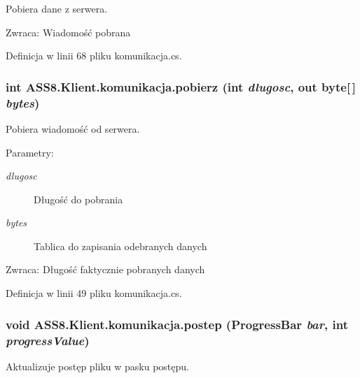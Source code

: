 Pobiera dane z serwera. 

\begin{Desc}
\item[Zwraca:]Wiadomość pobrana\end{Desc}


Definicja w linii 68 pliku komunikacja.cs.\hypertarget{a00013_19e1f9dd822287532839c60661237142}{
\subsubsection[{pobierz}]{\setlength{\rightskip}{0pt plus 5cm}int ASS8.Klient.komunikacja.pobierz (int {\em dlugosc}, \/  out byte\mbox{[}$\,$\mbox{]} {\em bytes})}}
\label{d7/dd4/a00013_19e1f9dd822287532839c60661237142}


Pobiera wiadomość od serwera. 

\begin{Desc}
\item[Parametry:]
\begin{description}
\item[{\em dlugosc}]Długość do pobrania\item[{\em bytes}]Tablica do zapisania odebranych danych\end{description}
\end{Desc}
\begin{Desc}
\item[Zwraca:]Długość faktycznie pobranych danych\end{Desc}


Definicja w linii 49 pliku komunikacja.cs.\hypertarget{a00013_2ff0f54013633857e608e3020ed82f70}{
\subsubsection[{postep}]{\setlength{\rightskip}{0pt plus 5cm}void ASS8.Klient.komunikacja.postep (ProgressBar {\em bar}, \/  int {\em progressValue})}}
\label{d7/dd4/a00013_2ff0f54013633857e608e3020ed82f70}


Aktualizuje postęp pliku w pasku postępu. 

